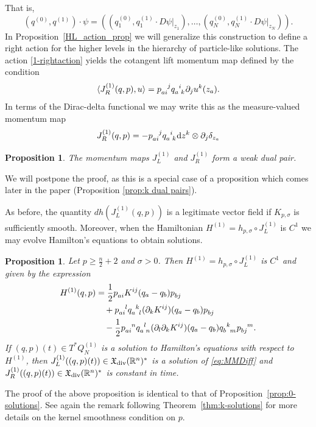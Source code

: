 \documentclass[12pt]{amsart}
\newcommand{\R}{\ensuremath{\mathbb{R}}}
\newcommand{\dz}{\ensuremath{\textrm{d}z}}
\newtheorem{prop}[thm]{Proposition}
\begin{document}
That is,
\begin{equation}
	 (q^{(0)}, q^{(1)}) \cdot \psi = \left( \left(q_1^{(0)}, q_1^{(1)} \cdot D\psi|_{z_1}\right), \ldots, \left(q_N^{(0)}, q_N^{(1)} \cdot D\psi|_{z_N}\right)\right). \label{1-rightaction}
\end{equation}
In Proposition~\ref{HL_action_prop} we will generalize this construction to define a right action for the higher levels in the hierarchy of particle-like solutions.
  The action \eqref{1-rightaction} yields the cotangent lift momentum map defined by the condition
  \begin{align*}
    \langle J_R^{(1)}(q,p) , u \rangle = p\indices{_a_i^j} q\indices{_a^i_k} \partial_j u^k(z_a).
  \end{align*}
  In terms of the Dirac-delta functional we may write this as the measure-valued momentum map
  \begin{equation}\label{eq:JR1}
    J_R^{(1)}(q,p) = - p\indices{_a_i^j} q\indices{_a^i_k} \dz^k \otimes \partial_j \delta_{z_a}
  \end{equation}
  
  \begin{prop}\label{prop:J1-dual-pair}
    The momentum maps $J_L^{(1)}$ and $J_R^{(1)}$ form a weak dual pair.
  \end{prop}
   We will postpone the proof, as this is a special case of a proposition which comes later in the paper (Proposition \ref{prop:k dual pairs}).

  As before, the quantity $dh( J_L^{(1)}(q,p))$ is a legitimate vector field
  if $K_{p,\sigma}$ is sufficiently smooth.  Moreover, when the Hamiltonian
  $H^{(1)} = h_{p,\sigma} \circ J_L^{(1)}$ is $C^1$ we may evolve Hamilton's equations
  to obtain solutions.

  \begin{prop} \label{prop:1-solutions}
    Let $p \ge \frac{n}{2} + 2$ and $\sigma > 0$.
    Then $H^{(1)} = h_{p,\sigma} \circ J_L^{(1)}$ is $C^1$ and given by the expression
	\begin{align*}
		H^{(1)}(q,p) &= \frac{1}{2} p\indices{_a_i} K^{ij}(q_a - q_b) p\indices{_b_j}\\
			&\quad + p\indices{_a_i^l} q\indices{_a^k_l} (\partial_k K^{ij})(q_a - q_b) p\indices{_b_j} \\
			&\quad -  \frac{1}{2} p\indices{_a_i^n} q\indices{_a^l_n} (\partial_l \partial_k K^{ij})(q_a - q_b) q\indices{_b^k_m} p\indices{_b_j^m}.
  \end{align*}
  If $(q,p)(t) \in T^*Q_N^{(1)}$ is a solution to Hamilton's equations with respect to
	$H^{(1)}$, then $J_L^{(1)}( (q,p)(t)) \in \mathfrak{X}_{\rm div}(\R^n)^*$ is
	a solution of \eqref{eq:MMDiff} and $J_R^{(1)}( (q,p)(t)) \in \mathfrak{X}_{\rm div}(\R^n)^*$ is
	constant in time. 
  \end{prop}
  The proof of the above proposition is identical to that of
  Proposition~\ref{prop:0-solutions}. See again the remark following
  Theorem~\ref{thm:k-solutions} for more details on the kernel
  smoothness condition on $p$.
\end{document}
